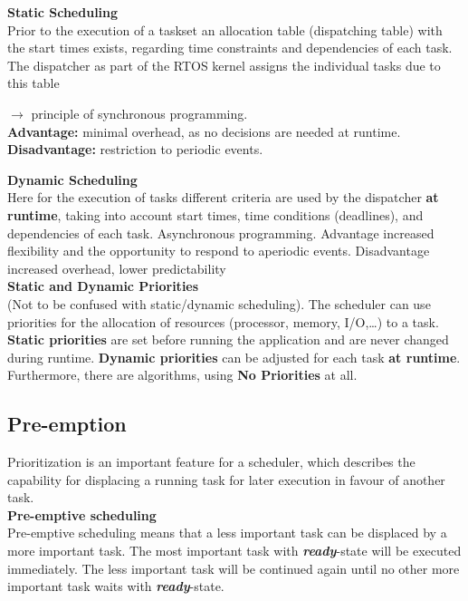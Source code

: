 {\rot\bf Static Scheduling}\\

Prior to the execution of a taskset an allocation table (dispatching table) with the start times exists, regarding time constraints and dependencies of each task. The dispatcher as part of the RTOS kernel assigns the individual tasks due to this table 

$\rightarrow$ principle of synchronous programming.\\

\textbf{Advantage: }  minimal overhead, as no decisions are needed at runtime. \\

\textbf{Disadvantage: }  restriction to periodic events.\\
\os{\newpage}

{\rot\bf Dynamic Scheduling}\\

Here for the execution of tasks different criteria are used by the dispatcher \textbf{at runtime}, taking into account start times, time conditions (deadlines), and dependencies of each task. Asynchronous programming. Advantage  increased flexibility and the opportunity to respond to aperiodic events. Disadvantage  increased overhead, lower predictability\\

{\rot\bf Static and Dynamic Priorities}\\

(Not to be confused with static/dynamic scheduling). The scheduler can use priorities for the allocation of resources (processor, memory, I/O,{\dots}) to a task. \textbf{Static priorities} are set before running the application and are never changed during runtime. \textbf{Dynamic priorities} can be adjusted for each task \textbf{at runtime}. Furthermore, there are algorithms, using \textbf{No Priorities} at all. 

\subsection{Pre-emption}

Prioritization is an important feature for a scheduler, which describes the capability for displacing a running task for later execution in favour of another task. \\

{\rot\bf{Pre-emptive scheduling }}\\

Pre-emptive scheduling means that a less important task can be displaced by a more important task. The most important task with \textbf{\textit{ready}}-state will be executed immediately. The less important task will be continued again until no other more important task waits with \textbf{\textit{ready}}-state.

